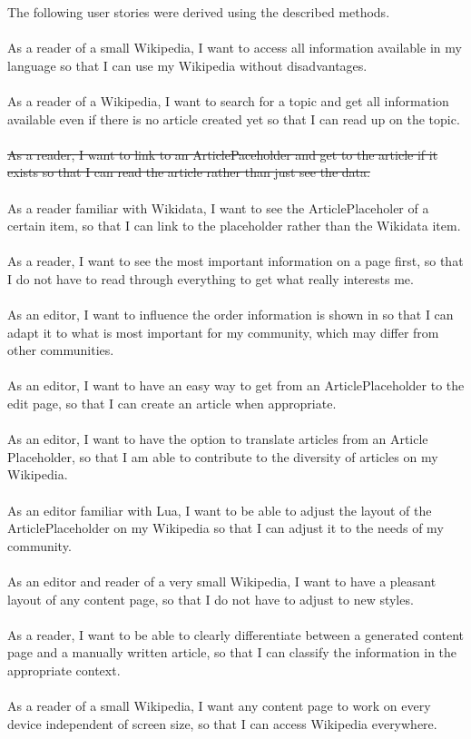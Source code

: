 The following user stories were derived using the described methods. \\
\\
As a reader of a small Wikipedia, I want to access all information available in my language so that I can use my Wikipedia without disadvantages. \\
\\
As a reader of a Wikipedia, I want to search for a topic and get all information available even if there is no article created yet so that I can read up on the topic. \\
\\
\st{As a reader, I want to link to an ArticlePaceholder and get to the article if it exists so that I can read the article rather than just see the data.} \\
\\
As a reader familiar with Wikidata, I want to see the ArticlePlaceholer of a certain item, so that I can link to the placeholder rather than the Wikidata item. \\
\\
As a reader, I want to see the most important information on a page first, so that I do not have to read through everything to get what really interests me. \\
\\
As an editor, I want to influence the order information is shown in so that I can adapt it to what is most important for my community, which may differ from other communities.\\
\\
As an editor, I want to have an easy way to get from an ArticlePlaceholder to the edit page, so that I can create an article when appropriate. \\
\\
As an editor, I want to have the option to translate articles from an Article Placeholder, so that I am able to contribute to the diversity of articles on my Wikipedia. \\
\\
As an editor familiar with Lua, I want to be able to adjust the layout of the ArticlePlaceholder on my Wikipedia so that I can adjust it to the needs of my community. \\
\\
As an editor and reader of a very small Wikipedia, I want to have a pleasant layout of any content page, so that I do not have to adjust to new styles. \\
\\
As a reader, I want to be able to clearly differentiate between a generated content page and a manually written article, so that I can classify the information in the appropriate context. \\
\\
As a reader of a small Wikipedia, I want any content page to work on every device independent of screen size, so that I can access Wikipedia everywhere. 